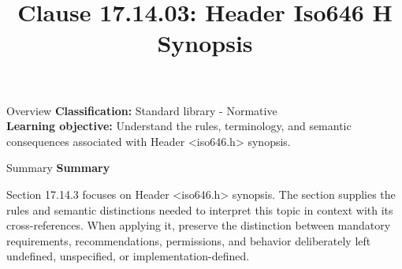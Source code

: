 \documentclass[10pt,letterpaper]{article}
\title{Clause 17.14.03: Header Iso646 H Synopsis}
\author{}
\date{}
\begin{document}
\maketitle
\begin{CornellOverviewBox}{Overview}
\textbf{Classification:} Standard library - Normative\\[2pt]
\textbf{Learning objective:} Understand the rules, terminology, and semantic consequences associated with Header <iso646.h> synopsis.
\end{CornellOverviewBox}\begin{CornellSummaryBox}{Summary}
{\sffamily\bfseries\color{Accent} Summary}\par\vspace{3pt}Section 17.14.3 focuses on Header <iso646.h> synopsis. The section supplies the rules and semantic distinctions needed to interpret this topic in context with its cross-references. When applying it, preserve the distinction between mandatory requirements, recommendations, permissions, and behavior deliberately left undefined, unspecified, or implementation-defined.
\end{CornellSummaryBox}
\end{document}
